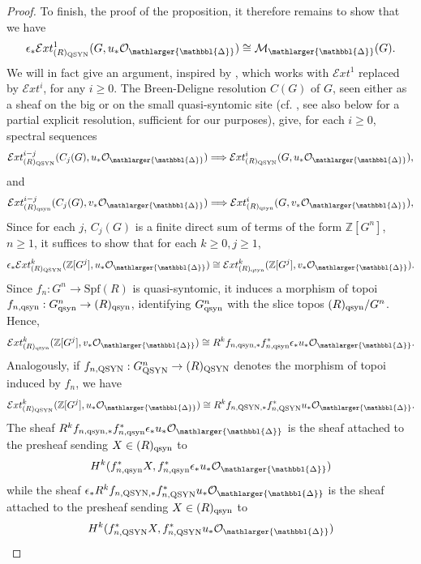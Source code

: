 \documentclass{amsart}
\newcommand{\prism}{{\mathlarger{\mathbbl{\Delta}}}}
\theoremstyle{plain}
\theoremstyle{definition}
\newcommand{\Z}{\mathbb{Z}}
\begin{document}
\begin{proof}
  To finish, the proof of the proposition, it therefore remains to show that we have
  $$
  \epsilon_\ast \mathcal{E}xt^1_{(R)_{\mathrm{QSYN}}}(G,u_\ast \mathcal{O}_\prism) \cong  \mathcal{M}_{\prism}(G).
  $$  
 We will in fact give an argument, inspired by \cite{bauer1992conjecture}, which works with $\mathcal{E}xt^1$ replaced by $\mathcal{E}xt^i$, for any $i\geq 0$. The Breen-Deligne resolution $C(G)$ of $G$, seen either as a sheaf on the big or on the small quasi-syntomic site (cf. \cite[Appendix to Lecture IV]{scholze_lectures_on_condensed_mathematics}, see also  below for a partial explicit resolution, sufficient for our purposes), give, for each $i\geq 0$, spectral sequences 
  $$
 \mathcal{E}xt^{i-j}_{(R)_{\mathrm{QSYN}}}(C_j(G),u_\ast \mathcal{O}_\prism) \Longrightarrow  \mathcal{E}xt^i_{(R)_{\mathrm{QSYN}}}(G,u_\ast \mathcal{O}_\prism), 
 $$
 and 
 $$
 \mathcal{E}xt^{i-j}_{(R)_{\mathrm{qsyn}}}(C_j(G),v_\ast \mathcal{O}_\prism) \Longrightarrow  \mathcal{E}xt^i_{(R)_{\mathrm{qsyn}}}(G,v_\ast \mathcal{O}_\prism), 
 $$
 Since for each $j$, $C_j(G)$ is a finite direct sum of terms of the form $\Z[G^n]$, $n\geq 1$, it suffices to show that for each $k\geq 0, j\geq 1$, 
 $$
 \epsilon_\ast  \mathcal{E}xt^k_{(R)_{\mathrm{QSYN}}}(\Z[G^j],u_\ast \mathcal{O}_\prism) \cong  \mathcal{E}xt^k_{(R)_{\mathrm{qsyn}}}(\Z[G^j],v_\ast \mathcal{O}_\prism).
 $$
   Since $f_n : G^n \to \mathrm{Spf}(R)$ is quasi-syntomic, it induces a morphism of topoi $f_{n,\rm qsyn}: G_{\rm qsyn}^n \to (R)_{\rm qsyn}$, identifying $G_{\rm qsyn}^n$ with the slice topos $(R)_{\rm qsyn}/G^n$. Hence,
    $$
    \mathcal{E}xt^k_{(R)_{\mathrm{qsyn}}}(\Z[G^j],v_\ast \mathcal{O}_\prism) \cong R^k f_{n,\mathrm{qsyn},\ast} f_{n, \rm qsyn}^\ast \epsilon_\ast u_\ast \mathcal{O}_\prism. 
    $$
    Analogously, if $f_{n,\rm QSYN}: G_{\rm QSYN}^n \to (R)_{\rm QSYN}$ denotes the morphism of topoi induced by $f_n$, we have 
     $$
    \mathcal{E}xt^k_{(R)_{\mathrm{QSYN}}}(\Z[G^j],u_\ast \mathcal{O}_\prism) \cong R^k f_{n,\mathrm{QSYN},\ast} f_{n, \rm QSYN}^\ast  u_\ast \mathcal{O}_\prism. 
    $$
   The sheaf $R^k f_{n,\mathrm{qsyn},\ast} f_{n, \rm qsyn}^\ast \epsilon_\ast u_\ast \mathcal{O}_\prism$ is the sheaf attached to the presheaf sending $X \in (R)_{\rm qsyn}$ to 
   $$
   H^k(f_{n, \rm qsyn}^\ast X,  f_{n, \rm qsyn}^\ast \epsilon_\ast u_\ast \mathcal{O}_\prism)
   $$
   while the sheaf $\epsilon_\ast R^k f_{n,\mathrm{QSYN},\ast} f_{n, \rm QSYN}^\ast  u_\ast \mathcal{O}_\prism$ is the sheaf attached to the presheaf sending 
   $X \in (R)_{\rm qsyn}$ to 
   $$
   H^k(f_{n, \rm QSYN}^\ast X,  f_{n, \rm QSYN}^\ast  u_\ast \mathcal{O}_\prism)
$$
\end{proof}
\end{document}

